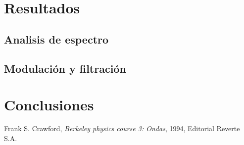 \documentclass[11pt,a4paper]{article}
\begin{document}
\section{Resultados}
\label{sec:discusion}

\subsection{Analisis de espectro}



\subsection{Modulación y filtración}




\section{Conclusiones}
\label{sec:conclusiones}








\begin{thebibliography}{1}
  Frank S. Crawford, \textit{Berkeley physics course 3: Ondas}, 1994, Editorial Reverte S.A.
\end{thebibliography}
 
\end{document}
